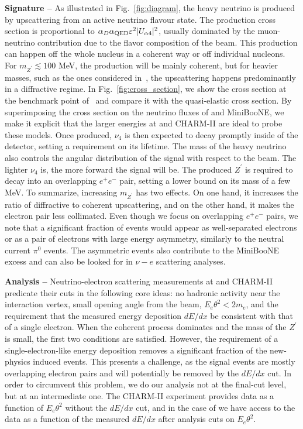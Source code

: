 \textbf{Signature --} As illustrated in Fig.~\ref{fig:diagram}, the heavy neutrino is produced by upscattering from an active neutrino flavour state. The production cross section is proportional to $ \alpha_D \alpha_{\rm QED} \varepsilon^2 |U_{\alpha 4}|^2$, usually dominated by the muon-neutrino contribution due to the flavor composition of the beam. This production can happen off the whole nucleus in a coherent way or off individual nucleons. For $m_{Z^\prime} \lesssim 100$ MeV, the production will be mainly coherent, but for heavier masses, such as the ones considered in~\cite{Ballett:2018ynz}, the upscattering happens predominantly in a diffractive regime. In Fig.~\ref{fig:cross_section}, we show the cross section at the benchmark point of~\cite{Bertuzzo:2018ftf} and compare it with the quasi-elastic cross section. By superimposing the cross section on the neutrino fluxes of \minerva and MiniBooNE, we make it explicit that the larger energies at \minerva and CHARM-II are ideal to probe these models. Once produced, $\nu_4$ is then expected to decay promptly inside of the detector, setting a requirement on its lifetime. The mass of the heavy neutrino also controls the angular distribution of the signal with respect to the beam. The lighter $\nu_4$ is, the more forward the signal will be.
The produced $Z^\prime$ is required to decay into an overlapping $e^+e^-$ pair, setting a lower bound on its mass of a few MeV.
To summarize, increasing $m_{Z^\prime}$ has two effects. On one hand, it increases the ratio of diffractive to coherent upscattering, and on the other hand, it makes the electron pair less collimated. 
Even though we focus on overlapping $e^+e^-$ pairs, we note that a significant fraction of events would appear as well-separated electrons or as a pair of electrons with large energy asymmetry, similarly to the neutral current $\pi^0$ events. The asymmetric events also contribute to the MiniBooNE excess and can also be looked for in $\nu-e$ scattering analyses.

{\bf Analysis --} Neutrino-electron scattering measurements at \minerva and CHARM-II predicate their cuts in the following core ideas: no hadronic activity near the interaction vertex, small opening angle from the beam, $E_e \theta^2 < 2 m_e$, and the requirement that the measured energy deposition $dE/dx$ be consistent with that of a single electron. When the coherent process dominates and the mass of the $Z^\prime$ is small, the first two conditions are satisfied. However, the requirement of a single-electron-like energy deposition removes a significant fraction of the new-physics induced events. This presents a challenge, as the signal events are mostly overlapping electron pairs and will potentially be removed by the $dE/dx$ cut.
In order to circumvent this problem, we do our analysis not at the final-cut level, but at an intermediate one. The CHARM-II experiment provides data as a function of $E_e \theta^2$ without the $dE/dx$ cut, and in the case of \minerva we have access to the data as a function of the measured $dE/dx$ after analysis cuts on $E_e \theta^2$.

